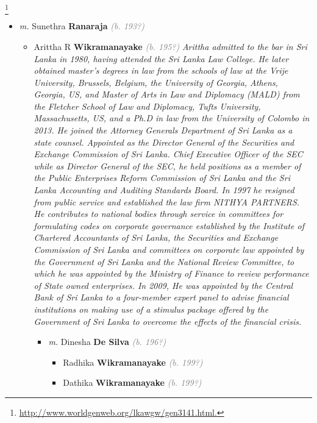 \documentclass[10pt, openany]{book}
\begin{document}
\begin{itemize}
{\begin{itemize}
{\begin{itemize}
{\begin{itemize}
{{{\footnote{\url{http://www.worldgenweb.org/lkawgw/gen3141.html.}}}}
\begin{itemize}
\item{\textit{m.} Sunethra \textbf{Ranaraja} \textcolor{gray}{\textit{(b. 193?)}}   \label{couple:00003908:00003909} \begin{itemize}
\item{Arittha R \textbf{Wikramanayake} \textcolor{gray}{\textit{(b. 195?)}} \textcolor{slmaroon}{\textit{Arittha admitted to the bar in Sri Lanka in 1980, having attended the Sri Lanka Law College. He later obtained master's degrees in law from the schools of law at the Vrije University, Brussels, Belgium, the University of Georgia, Athens, Georgia, US, and Master of Arts in Law and Diplomacy (MALD) from the Fletcher School of Law and Diplomacy, Tufts University, Massachusetts, US, and a Ph.D in law from the University of Colombo in 2013. He joined the Attorney Generals Department of Sri Lanka as a state counsel. Appointed as the Director General of the Securities and Exchange Commission of Sri Lanka. Chief Executive Officer of the SEC while as Director General of the SEC, he held positions as a member of the Public Enterprises Reform Commission of Sri Lanka and the Sri Lanka Accounting and Auditing Standards Board. In 1997 he resigned from public service and established the law firm NITHYA PARTNERS.
He contributes to national bodies through service in committees for formulating codes on corporate governance established by the Institute of Chartered Accountants of Sri Lanka, the Securities and Exchange Commission of Sri Lanka and committees on corporate law appointed by the Government of Sri Lanka and the National Review Committee, to which he was appointed by the Ministry of Finance to review performance of State owned enterprises. In 2009, He was appointed by the Central Bank of Sri Lanka to a four-member expert panel to advise financial institutions on making use of a stimulus package offered by the Government of Sri Lanka to overcome the effects of the financial crisis.}}
\begin{itemize}
\item{\textit{m.} Dinesha \textbf{De Silva} \textcolor{gray}{\textit{(b. 196?)}}   \label{couple:00003910:00003911} \begin{itemize}
\item{Radhika \textbf{Wikramanayake} \textcolor{gray}{\textit{(b. 199?)}}
 }
\item{Dathika \textbf{Wikramanayake} \textcolor{gray}{\textit{(b. 199?)}}
}
\end{itemize}}
\end{itemize}}
\end{itemize}}
\end{itemize}}
\end{itemize}}
\end{itemize}}
\end{itemize}}
\end{itemize}
\end{document}

